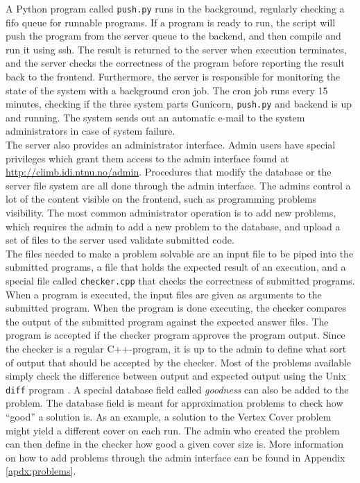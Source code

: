 A Python program called \texttt{push.py} runs in the background, regularly checking a \gls{fifo} queue for runnable programs. If a program is ready to run, the script will push the program from the server queue to the backend, and then compile and run it using \gls{ssh}. The result is returned to the server when execution terminates, and the server checks the correctness of the program before reporting the result back to the frontend. Furthermore, the server is responsible for monitoring the state of the system with a background cron job. The cron job runs every 15 minutes, checking if the three system parts Gunicorn, \texttt{push.py} and backend is up and running. The system sends out an automatic e-mail to the system administrators in case of system failure. \\

The server also provides an administrator interface. Admin users have special privileges which grant them access to the admin interface found at \url{http://climb.idi.ntnu.no/admin}. Procedures that modify the database or the server file system are all done through the admin interface. The admins control a lot of the content visible on the frontend, such as programming problems visibility. The most common administrator operation is to add new problems, which requires the admin to add a new problem to the database, and upload a set of files to the server used validate submitted code. \\

The files needed to make a problem solvable are an input file to be piped into the submitted programs, a file that holds the expected result of an execution, and a special file called \texttt{checker.cpp} that checks the correctness of submitted programs. When a program is executed, the input files are given as arguments to the submitted program. When the program is done executing, the checker compares the output of the submitted program against the expected answer files. The program is accepted if the checker program approves the program output. Since the checker is a regular C++-program, it is up to the admin to define what sort of output that should be accepted by the checker. Most of the problems available simply check the difference between output and expected output using the Unix \texttt{diff} program \cite{DIFF}. A special database field called \textit{goodness} can also be added to the problem. The database field is meant for approximation problems to check how ``good'' a solution is. As an example, a solution to the Vertex Cover problem might yield a different cover on each run. The admin who created the problem can then define in the checker how good a given cover size is. More information on how to add problems through the admin interface can be found in Appendix \ref{apdx:problems}.

